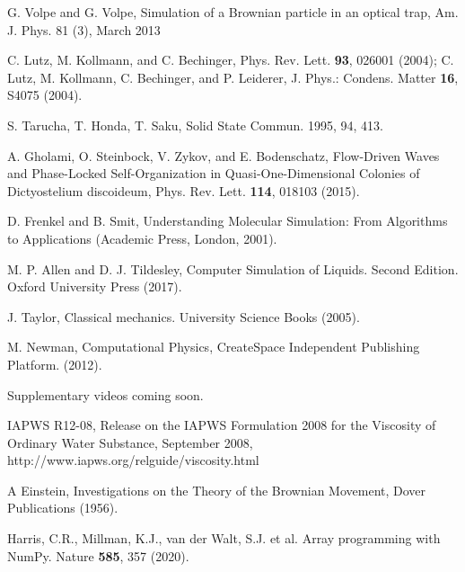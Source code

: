 \documentclass[twocolumn,preprintnumbers,amsmath,amssymb,aps,prx]{revtex4}
\begin{document}
\begin{thebibliography}{99}
       G. Volpe and G. Volpe, Simulation of a Brownian particle in an optical trap, Am. J. Phys. 81 (3), March 2013
        
     C. Lutz, M. Kollmann, and C. Bechinger, Phys. Rev. Lett. {\bf 93}, 026001 (2004); C. Lutz, M. Kollmann, C. Bechinger, and P. Leiderer, J. Phys.: Condens. Matter {\bf 16}, S4075 (2004).

      S. Tarucha, T. Honda,  T. Saku, Solid State Commun. 1995, 94, 413.

     A. Gholami, O. Steinbock, V. Zykov, and E. Bodenschatz, Flow-Driven Waves and Phase-Locked Self-Organization in Quasi-One-Dimensional Colonies of Dictyostelium discoideum, Phys. Rev. Lett. {\bf 114}, 018103 (2015).


     D. Frenkel and B. Smit, Understanding Molecular Simulation: From Algorithms to Applications (Academic Press, London, 2001).
      
     M. P. Allen and D. J. Tildesley, Computer Simulation of Liquids.  Second Edition. Oxford University Press (2017).

     J. Taylor,  Classical mechanics. University Science Books (2005).

       M. Newman, Computational Physics, CreateSpace Independent Publishing Platform. (2012).
      
       Supplementary videos coming soon.

  IAPWS R12-08, 
  Release on the IAPWS Formulation 2008 for the Viscosity of Ordinary Water Substance, 
  September 2008, 
  http://www.iapws.org/relguide/viscosity.html

   A Einstein, Investigations on the Theory of the Brownian Movement,  Dover Publications (1956).

     Harris, C.R., Millman, K.J., van der Walt, S.J. et al. Array programming with NumPy. Nature {\bf 585}, 357 (2020). %
    

\end{thebibliography}
\end{document}
